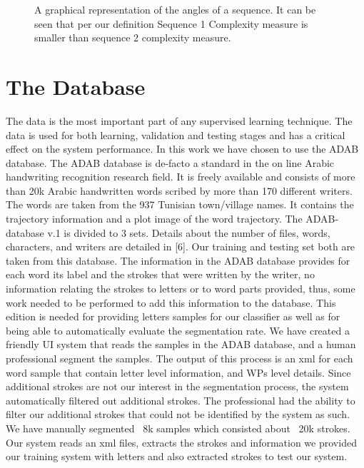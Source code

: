 \documentclass[journal,compsoc]{IEEEtran}
\begin{document}
\begin{figure}[h]
     \begin{center}
    \end{center}
    \caption{A graphical representation of the angles of a sequence. It can be seen that per our definition Sequence 1 Complexity measure is smaller than sequence 2 complexity measure.}
   \label{fig:sequence_complexity}
\end{figure}

\section{The Database}
\label{sec:database}
The data is the most important part of any supervised learning technique. The data is used for both learning, validation and testing stages and has a critical effect on the system performance. In this work we have chosen to use the ADAB database. The ADAB database is de-facto a standard in the on line Arabic handwriting recognition research field. It is freely available and consists of more than 20k Arabic handwritten words scribed by more than 170 different writers. The words are taken from the 937 Tunisian town/village names. It contains the trajectory information and a plot image of the word trajectory. The ADAB-database v.1 is divided to 3 sets. Details about the number of files, words, characters, and writers are detailed in [6]. Our training and testing set both are taken from this database. 
The information in the ADAB database provides for each word its label and the strokes that were written by the writer, no information relating the strokes to letters or to word parts provided, thus, some work needed to be performed to add this information to the database. This edition is needed for providing letters samples for our classifier as well as for being able to automatically evaluate the segmentation rate. We have created a friendly UI system that reads the samples in the ADAB database, and a human professional segment the samples. The output of this process is an xml for each word sample that contain letter level information, and WPs level details. Since additional strokes are not our interest in the segmentation process, the system automatically filtered out additional strokes. The professional had the ability to filter our additional strokes that could not be identified by the system as such. We have manually segmented ~8k samples which consisted about ~20k strokes.
Our system reads an xml files, extracts the strokes and information we provided our training system with letters and also extracted strokes to test our system. 
\end{document}

